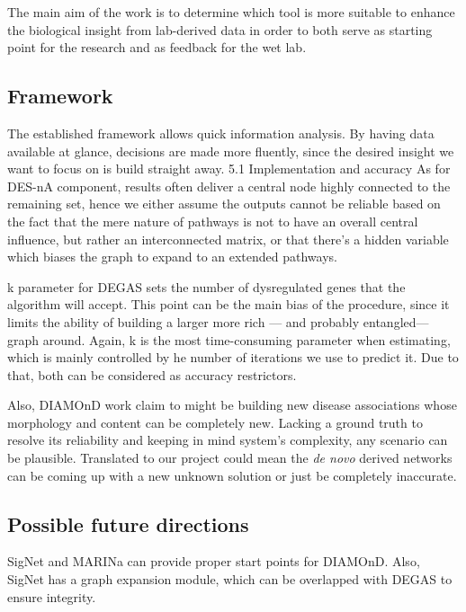 The main aim of the work is to determine which tool is more suitable to enhance the biological insight from lab-derived data in order to both serve as starting point for the research and as feedback for the wet lab.

\subsection{Framework}
The established framework allows quick information analysis. By having data available at glance, decisions are made more fluently, since the desired insight we want to focus on is build straight away.
5.1 Implementation and accuracy
As for DES-nA component, results often deliver a central node highly connected to the remaining set, hence we either assume the outputs cannot be reliable based on the fact that the mere nature of pathways is not to have an overall central influence, but rather an interconnected matrix, or that there’s a hidden variable which biases the graph to expand to an extended pathways.

k  parameter for DEGAS sets the number of dysregulated genes that the algorithm will accept. This point can be the main bias of the procedure, since it limits the ability of building a larger more rich — and  probably entangled— graph around. Again, k is the most time-consuming parameter when estimating, which is mainly controlled by he number of iterations we use to predict it. Due to that, both can be considered as accuracy restrictors.

Also, DIAMOnD work claim to might be building new disease associations whose morphology and content can be completely new. Lacking a ground truth to resolve its reliability and keeping in mind system’s complexity, any scenario can be plausible. Translated to our project could mean the \textit{de novo} derived networks can be coming up with a new unknown solution or just be completely inaccurate. 

\subsection{Possible future directions}
SigNet and MARINa can provide proper start points for DIAMOnD. Also, SigNet has a graph expansion module, which can be overlapped with DEGAS to ensure integrity.

